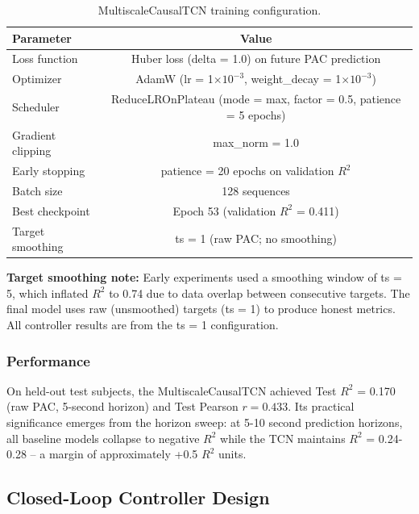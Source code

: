 \documentclass[11pt,letterpaper]{article}
\begin{document}
\begin{table}[htbp]
\centering
\caption{MultiscaleCausalTCN training configuration.}
\label{tab:table_1}
\small
\begin{tabular}{lc}
\toprule
\textbf{Parameter} & \textbf{Value} \\
\midrule
Loss function & Huber loss (delta = 1.0) on future PAC prediction \\
Optimizer & AdamW (lr = 1$\times 10^{-3}$, weight\_decay = 1$\times 10^{-3}$) \\
Scheduler & ReduceLROnPlateau (mode = max, factor = 0.5, patience = 5 epochs) \\
Gradient clipping & max\_norm = 1.0 \\
Early stopping & patience = 20 epochs on validation $R^2$ \\
Batch size & 128 sequences \\
Best checkpoint & Epoch 53 (validation $R^2$ = 0.411) \\
Target smoothing & ts = 1 (raw PAC; no smoothing) \\
\bottomrule
\end{tabular}
\end{table}

\textbf{Target smoothing note:} Early experiments used a smoothing window of ts = 5, which inflated $R^2$ to 0.74 due to data overlap between consecutive targets. The final model uses raw (unsmoothed) targets (ts = 1) to produce honest metrics. All controller results are from the ts = 1 configuration.

\subsubsection{Performance}

On held-out test subjects, the MultiscaleCausalTCN achieved Test $R^2$ = 0.170 (raw PAC, 5-second horizon) and Test Pearson $r = 0.433$. Its practical significance emerges from the horizon sweep: at 5-10 second prediction horizons, all baseline models collapse to negative $R^2$ while the TCN maintains $R^2$ = 0.24-0.28 -- a margin of approximately +0.5 $R^2$ units.

\subsection{Closed-Loop Controller Design}
\end{document}
